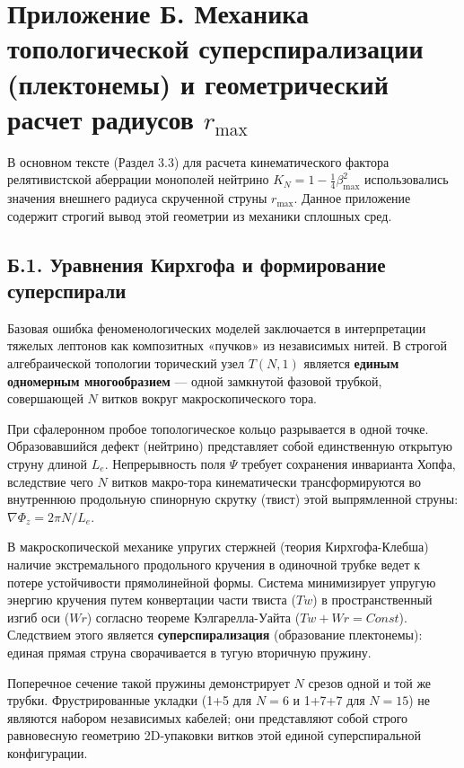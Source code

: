 \documentclass[11pt,a4paper]{article}
\begin{document}
\section*{Приложение Б. Механика топологической суперспирализации (плектонемы) и геометрический расчет радиусов $r_{\text{max}}$}
	
	В основном тексте (Раздел 3.3) для расчета кинематического фактора релятивистской аберрации монополей нейтрино $K_N = 1 - \frac{1}{4}\beta_{\text{max}}^2$ использовались значения внешнего радиуса скрученной струны $r_{\text{max}}$. Данное приложение содержит строгий вывод этой геометрии из механики сплошных сред.
	
\subsection*{Б.1. Уравнения Кирхгофа и формирование суперспирали}
	Базовая ошибка феноменологических моделей заключается в интерпретации тяжелых лептонов как композитных «пучков» из независимых нитей. В строгой алгебраической топологии торический узел $T(N,1)$ является \textbf{единым одномерным многообразием} — одной замкнутой фазовой трубкой, совершающей $N$ витков вокруг макроскопического тора.
	
	При сфалеронном пробое топологическое кольцо разрывается в одной точке. Образовавшийся дефект (нейтрино) представляет собой единственную открытую струну длиной $L_e$. Непрерывность поля $\Psi$ требует сохранения инварианта Хопфа, вследствие чего $N$ витков макро-тора кинематически трансформируются во внутреннюю продольную спинорную скрутку (твист) этой выпрямленной струны: $\nabla \Phi_z = 2\pi N / L_e$.
	
	В макроскопической механике упругих стержней (теория Кирхгофа-Клебша) наличие экстремального продольного кручения в одиночной трубке ведет к потере устойчивости прямолинейной формы. Система минимизирует упругую энергию кручения путем конвертации части твиста ($Tw$) в пространственный изгиб оси ($Wr$) согласно теореме Кэлгарелла-Уайта ($Tw + Wr = Const$).
	Следствием этого является \textbf{суперспирализация} (образование плектонемы): единая прямая струна сворачивается в тугую вторичную пружину. 
	
	Поперечное сечение такой пружины демонстрирует $N$ срезов одной и той же трубки. Фрустрированные укладки (1+5 для $N=6$ и 1+7+7 для $N=15$) не являются набором независимых кабелей; они представляют собой строго равновесную геометрию 2D-упаковки витков этой единой суперспиральной конфигурации.
	
\end{document}
